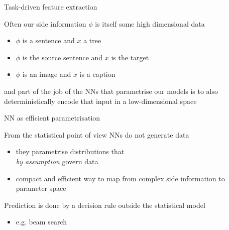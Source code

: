 \documentclass[14pt]{beamer}
\begin{document}
\begin{frame}{Task-driven feature extraction}

Often our side information $\phi$ is itself some high dimensional data
\begin{itemize}
	\item $\phi$ is a sentence and $x$ a tree
	\item $\phi$ is the source sentence and $x$ is the target
	\item $\phi$ is an image and $x$ is a caption
\end{itemize}
and part of the job of the NNs that parametrise our models is to also \alert{deterministically} encode that input in a low-dimensional space


\end{frame}


\begin{frame}{NN as efficient parametrisation}

From the statistical point of view NNs do not generate data\\
\begin{itemize}
	\item \alert{they parametrise distributions} that \\
	\emph{by assumption} govern data
	\item compact and efficient way to \alert{map from complex side information to parameter space}
\end{itemize}

\vspace{10pt}

\pause
Prediction is done by a decision rule outside the statistical model
\begin{itemize}
	\item e.g. beam search
\end{itemize}

\end{frame}
\end{document}
